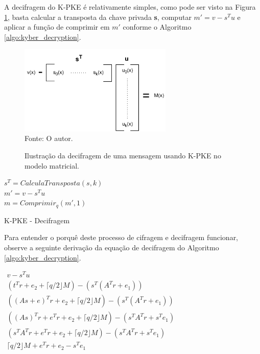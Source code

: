    A decifragem do K-PKE é relativamente simples, como pode ser visto na Figura \ref{fig:kyber_dec}, basta calcular a transposta da chave privada \textbf{s}, computar $m' = v - s^T u$ e aplicar a função de comprimir em $m'$ conforme o Algoritmo \ref{algo:kyber_decryption}.

    \begin{figure}[htb!]
        \centering
        \caption{Ilustração da decifragem de uma mensagem usando K-PKE no modelo matricial.}
        \includegraphics[width=0.65\textwidth]{Figuras/kyber_dec.png}\\
        \footnotesize{Fonte: O autor.}
        \label{fig:kyber_dec}
    \end{figure}

    \begin{algorithm}[!htbp]
            \SetAlgoLined
            
            $s^T = CalculaTransposta(s, k)$\\
            $m' = v-s^T u$\\
            $m = Comprimir_{q}(m',1)$
            
        
            \caption{K-PKE - Decifragem}
            \label{algo:kyber_decryption}
        \end{algorithm}

    Para entender o porquê deste processo de cifragem e decifragem funcionar, observe a seguinte derivação da equação de decifragem do Algoritmo \ref{algo:kyber_decryption}.

    \begin{center}
        $\begin{array}{c}
            v-s^{T}u\\
            (t^{T}r + e_2 + \lceil q/2 \rfloor M) - (s^T(A^T r + e_1))\\
            ((As + e)^T r + e_2 + \lceil q/2 \rfloor M) - (s^T(A^T r + e_1))\\
            ((As)^T r + e^T r + e_2 + \lceil q/2 \rfloor M) - (s^T A^T r + s^T e_1)\\
            (s^T A^T r + e^T r + e_2 + \lceil q/2 \rfloor M) - (s^T A^T r + s^T e_1)\\
            \lceil q/2 \rfloor M + e^T r + e_2 - s^T e_1\\
        \end{array}$
    \end{center}

